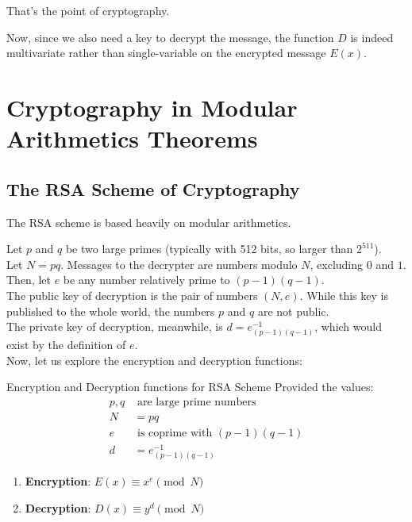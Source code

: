 That's the point of cryptography.

Now, since we also need a key to decrypt the message, the function $D$ is indeed multivariate rather than single-variable on the encrypted message $E(x)$.

\section{Cryptography in Modular Arithmetics Theorems}

\subsection{The RSA Scheme of Cryptography}
The RSA scheme is based heavily on modular arithmetics.

Let $p$ and $q$ be two large primes (typically with 512 bits, so larger than $2^{511}$). \\
Let $N = pq$. Messages to the decrypter are numbers modulo $N$, excluding $0$ and $1$. \\
Then, let $e$ be any number relatively prime to $(p - 1)(q - 1)$. \\
The public key of decryption is the pair of numbers $(N, e)$. While this key is published to the whole world, the numbers $p$ and $q$ are not public. \\
The private key of decryption, meanwhile, is $d = {e}_{(p - 1)(q - 1)}^{-1}$, which would exist by the definition of $e$. \\
Now, let us explore the encryption and decryption functions:
\begin{ln-define}{Encryption and Decryption functions for RSA Scheme}{}
    Provided the values:
    \begin{align*}
        p, q &\text{ are large prime numbers} \\
        N &= pq \\
        e &\text{ is coprime with $(p - 1)(q - 1)$} \\
        d &= {e}_{(p - 1)(q - 1)}^{-1}
    \end{align*}
    \begin{enumerate}
        \item[] \textbf{Encryption}: $E(x) \equiv x^e\pmod{N}$
        \item[] \textbf{Decryption}: $D(x) \equiv y^d\pmod{N}$
    \end{enumerate}
\end{ln-define}
